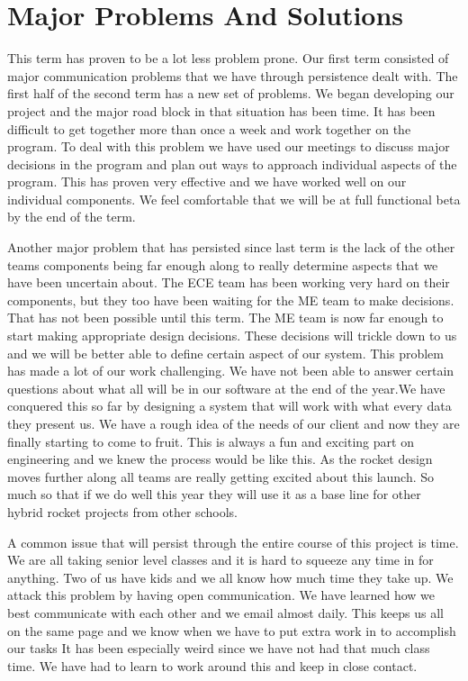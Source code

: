 \documentclass[10pt,draftclsnofoot,onecolumn]{IEEEtran}
\begin{document}
\section{Major Problems And Solutions}
This term has proven to be a lot less problem prone. Our first term consisted of major communication problems that we have through persistence dealt with. The first half of the second term has a new set of problems. We began developing our project and the major road block in that situation has been time. It has been difficult to get together more than once a week and work together on the program. To deal with this problem we have used our meetings to discuss major decisions in the program and plan out ways to approach individual aspects of the program. This has proven very effective and we have worked well on our individual components. We feel comfortable that we will be at full functional beta by the end of the term. \par
Another major problem that has persisted since last term is the lack of the other teams components being far enough along to really determine aspects that we have been uncertain about. The ECE team has been working very hard on their components, but they too have been waiting for the ME team to make decisions. That has not been possible until this term. The ME team is now far enough to start making appropriate design decisions. These decisions will trickle down to us and we will be better able to define certain aspect of our system. This problem has made a lot of our work challenging. We have not been able to answer certain questions about what all will be in our software at the end of the year.We have conquered this so far by designing a system that will work with what every data they present us. We have a rough idea of the needs of our client and now they are finally starting to come to fruit. This is always a fun and exciting part on engineering and we knew the process would be like this. As the rocket design moves further along all teams are really getting excited about this launch. So much so that if we do well this year they will use it as a base line for other hybrid rocket projects from other schools. \par
A common issue that will persist through the entire course of this project is time. We are all taking senior level classes and it is hard to squeeze any time in for anything. Two of us have kids and we all know how much time they take up. We attack this problem by having open communication. We have learned how we best communicate with each other and we email almost daily. This keeps us all on the same page and we know when we have to put extra work in to accomplish our tasks It has been especially weird since we have not had that much class time. We have had to learn to work around this and keep in close contact.\par
\end{document}
